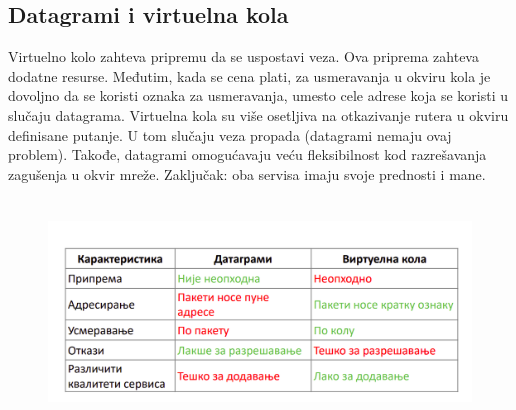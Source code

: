 \documentclass[a4paper]{article}
\begin{document}
    \subsection{Datagrami i virtuelna kola}
        Virtuelno kolo zahteva pripremu da se uspostavi veza. Ova priprema zahteva dodatne resurse.
        Međutim, kada se cena plati, za usmeravanja u okviru kola je dovoljno da se koristi
        oznaka za usmeravanja, umesto cele adrese koja se koristi u slučaju datagrama. Virtuelna
        kola su više osetljiva na otkazivanje rutera u okviru definisane putanje. U tom slučaju
        veza propada (datagrami nemaju ovaj problem). Takođe, datagrami omogućavaju veću
        fleksibilnost kod razrešavanja zagušenja u okvir mreže. Zaključak: oba servisa
        imaju svoje prednosti i mane.   
        \begin{figure}[H]
            \begin{center}
                \includegraphics[width=120mm,height=60mm]{Slike/divk.png}
            \end{center}
        \end{figure}

    \newpage
\end{document}
